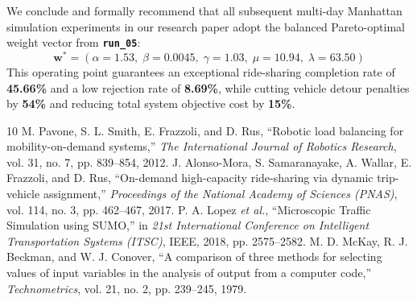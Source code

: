 \documentclass[11pt,a4paper]{article}
\begin{document}
We conclude and formally recommend that all subsequent multi-day Manhattan simulation experiments in our research paper adopt the balanced Pareto-optimal weight vector from \textbf{\texttt{run\_05}}:
\begin{equation}
\mathbf{w}^* = (\alpha=1.53, \; \beta=0.0045, \; \gamma=1.03, \; \mu=10.94, \; \lambda=63.50)
\label{eq:optimal_vector}
\end{equation}
This operating point guarantees an exceptional ride-sharing completion rate of \textbf{45.66\%} and a low rejection rate of \textbf{8.69\%}, while cutting vehicle detour penalties by \textbf{54\%} and reducing total system objective cost by \textbf{15\%}.

\begin{thebibliography}{10}
M. Pavone, S. L. Smith, E. Frazzoli, and D. Rus, ``Robotic load balancing for mobility-on-demand systems,'' \textit{The International Journal of Robotics Research}, vol. 31, no. 7, pp. 839--854, 2012.
J. Alonso-Mora, S. Samaranayake, A. Wallar, E. Frazzoli, and D. Rus, ``On-demand high-capacity ride-sharing via dynamic trip-vehicle assignment,'' \textit{Proceedings of the National Academy of Sciences (PNAS)}, vol. 114, no. 3, pp. 462--467, 2017.
P. A. Lopez \textit{et al.}, ``Microscopic Traffic Simulation using SUMO,'' in \textit{21st International Conference on Intelligent Transportation Systems (ITSC)}, IEEE, 2018, pp. 2575--2582.
M. D. McKay, R. J. Beckman, and W. J. Conover, ``A comparison of three methods for selecting values of input variables in the analysis of output from a computer code,'' \textit{Technometrics}, vol. 21, no. 2, pp. 239--245, 1979.
\end{thebibliography}
\end{document}

